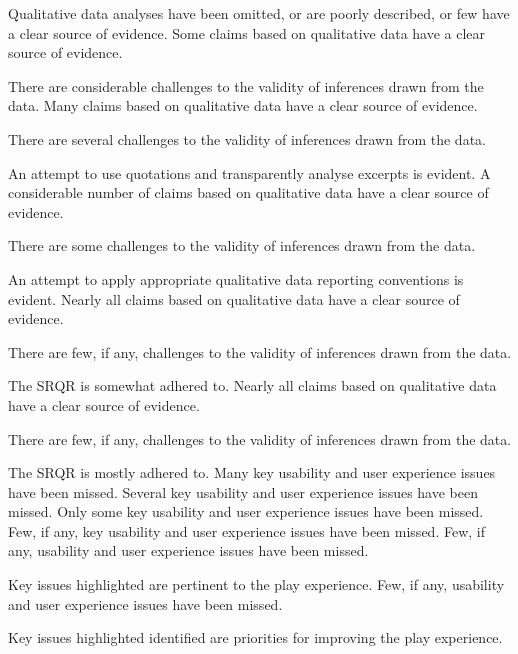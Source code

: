\documentclass{../../fal_assignment}
\begin{document}
\begin{markingrubric}
%
        \grade\fail 	Qualitative data analyses have been omitted, or are poorly described, or few have a clear source of evidence.
        \grade		Some claims based on qualitative data have a clear source of evidence.
	\par 		There are considerable challenges to the validity of inferences drawn from the data.
        \grade		Many claims based on qualitative data have a clear source of evidence.
        \par 		There are several challenges to the validity of inferences drawn from the data.
	\par 		An attempt to use quotations and transparently analyse excerpts is evident.
        \grade		A considerable number of claims based on qualitative data have a clear source of evidence.
        \par		There are some challenges to the validity of inferences drawn from the data.
        \par 		An attempt to apply appropriate qualitative data reporting conventions is evident.
        \grade		Nearly all claims based on qualitative data have a clear source of evidence.
        \par		There are few, if any, challenges to the validity of inferences drawn from the data.
        \par 		The SRQR is somewhat adhered to.
        \grade		Nearly all claims based on qualitative data have a clear source of evidence.
        \par		There are few, if any, challenges to the validity of inferences drawn from the data.
        \par		The SRQR is mostly adhered to.
%
        \grade\fail 	Many key usability and user experience issues have been missed.
        \grade		Several key usability and user experience issues have been missed.
        \grade		Only some key usability and user experience issues have been missed.
        \grade		Few, if any, key usability and user experience issues have been missed.
        \grade		Few, if any, usability and user experience issues have been missed.
        \par		Key issues highlighted are pertinent to the play experience.
        \grade		Few, if any, usability and user experience issues have been missed.
        \par		Key issues highlighted identified are priorities for improving the play experience.

\end{markingrubric}
\end{document}
